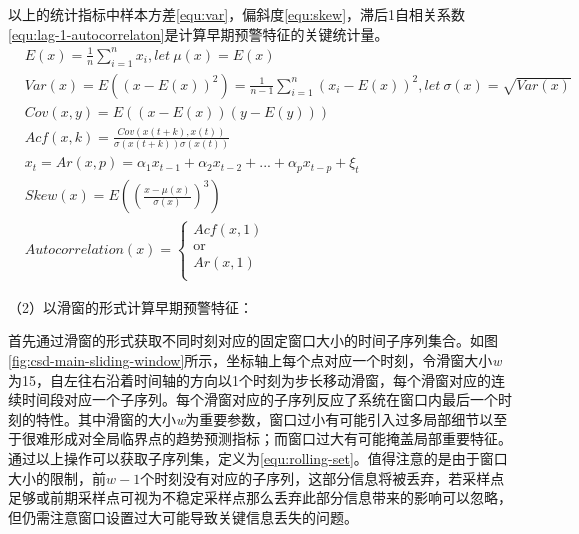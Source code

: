 以上的统计指标中样本方差\ref{equ:var}，偏斜度\ref{equ:skew}，滞后1自相关系数\ref{equ:lag-1-autocorrelaton}是计算早期预警特征的关键统计量。
\begin{subequations}
\begin{align}
& E(x) = \frac{1}{n}\sum_{i=1}^{n}x_{i} , let\ \mu (x)=E(x) \label{equ:mean}\\
& Var(x) = E((x-E(x))^{2}) = \frac{1}{n-1}\sum_{i=1}^{n}(x_{i}-E(x))^{2}, let\ \sigma(x)= \sqrt{Var(x)} \label{equ:var}\\
& Cov(x,y) = E((x-E(x))(y-E(y))) \label{equ:cov}\\
& Acf(x, k) = \frac{Cov(x(t+k), x(t))}{\sigma(x(t+k))\sigma(x(t))} \label{equ:acf} \\
& x_{t} = Ar(x,p) = \alpha_{1}x_{t-1} + \alpha_{2}x_{t-2} + ... + \alpha_{p}x_{t-p} +\xi _{t} \label{equ:ar-model} \\
& Skew(x) = E((\frac{x-\mu(x)}{\sigma(x)})^3) \label{equ:skew} \\[0.1cm]
& Autocorrelation(x) = \left\{\begin{array}{l}
Acf(x, 1)\\ [0.1cm]
\mbox{or}\\[0.1cm]
Ar(x, 1)\\[0.1cm]
\end{array}\right. \label{equ:lag-1-autocorrelaton}
\end{align}
\end{subequations}

（2）以滑窗的形式计算早期预警特征：

首先通过滑窗的形式获取不同时刻对应的固定窗口大小的时间子序列集合。如图\ref{fig:csd-main-sliding-window}所示，坐标轴上每个点对应一个时刻，令滑窗大小\emph{w}为15，自左往右沿着时间轴的方向以1个时刻为步长移动滑窗，每个滑窗对应的连续时间段对应一个子序列。每个滑窗对应的子序列反应了系统在窗口内最后一个时刻的特性。其中滑窗的大小\emph{w}为重要参数，窗口过小有可能引入过多局部细节以至于很难形成对全局临界点的趋势预测指标；而窗口过大有可能掩盖局部重要特征。通过以上操作可以获取子序列集，定义为\ref{equ:rolling-set}。值得注意的是由于窗口大小的限制，前$w-1$个时刻没有对应的子序列，这部分信息将被丢弃，若采样点足够或前期采样点可视为不稳定采样点那么丢弃此部分信息带来的影响可以忽略，但仍需注意窗口设置过大可能导致关键信息丢失的问题。


